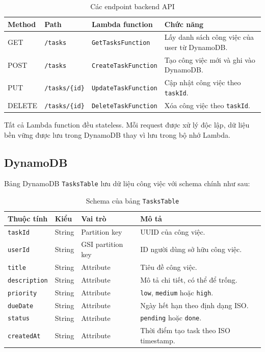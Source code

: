 \begin{table}[H]
\centering
\begin{tabular}{|p{2.2cm}|p{3cm}|p{4cm}|p{4cm}|}
\hline
\textbf{Method} & \textbf{Path} & \textbf{Lambda function} & \textbf{Chức năng} \\
\hline
GET & \texttt{/tasks} & \texttt{GetTasksFunction} & Lấy danh sách công việc của user từ DynamoDB. \\
\hline
POST & \texttt{/tasks} & \texttt{CreateTaskFunction} & Tạo công việc mới và ghi vào DynamoDB. \\
\hline
PUT & \texttt{/tasks/\{id\}} & \texttt{UpdateTaskFunction} & Cập nhật công việc theo \texttt{taskId}. \\
\hline
DELETE & \texttt{/tasks/\{id\}} & \texttt{DeleteTaskFunction} & Xóa công việc theo \texttt{taskId}. \\
\hline
\end{tabular}
\caption{Các endpoint backend API}
\end{table}

Tất cả Lambda function đều stateless. Mỗi request được xử lý độc lập, dữ liệu bền vững được lưu trong DynamoDB thay vì lưu trong bộ nhớ Lambda.

\subsection{DynamoDB}

Bảng DynamoDB \texttt{TasksTable} lưu dữ liệu công việc với schema chính như sau:

\begin{table}[H]
\centering
\begin{tabular}{|p{3cm}|p{2.5cm}|p{3cm}|p{5cm}|}
\hline
\textbf{Thuộc tính} & \textbf{Kiểu} & \textbf{Vai trò} & \textbf{Mô tả} \\
\hline
\texttt{taskId} & String & Partition key & UUID của công việc. \\
\hline
\texttt{userId} & String & GSI partition key & ID người dùng sở hữu công việc. \\
\hline
\texttt{title} & String & Attribute & Tiêu đề công việc. \\
\hline
\texttt{description} & String & Attribute & Mô tả chi tiết, có thể để trống. \\
\hline
\texttt{priority} & String & Attribute & \texttt{low}, \texttt{medium} hoặc \texttt{high}. \\
\hline
\texttt{dueDate} & String & Attribute & Ngày hết hạn theo định dạng ISO. \\
\hline
\texttt{status} & String & Attribute & \texttt{pending} hoặc \texttt{done}. \\
\hline
\texttt{createdAt} & String & Attribute & Thời điểm tạo task theo ISO timestamp. \\
\hline
\end{tabular}
\caption{Schema của bảng \texttt{TasksTable}}
\end{table}

